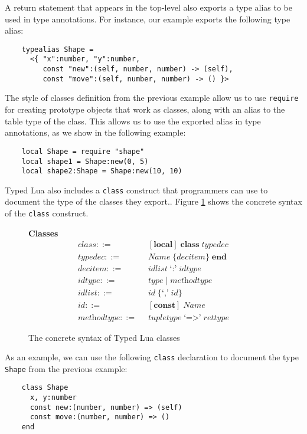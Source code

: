 A return statement that appears in the top-level also exports
a type alias to be used in type annotations.
For instance, our example exports the following type alias:
\begin{verbatim}
    typealias Shape =
      <{ "x":number, "y":number,
         const "new":(self, number, number) -> (self),
         const "move":(self, number, number) -> () }>
\end{verbatim}

The style of classes definition from the previous example
allow us to use \texttt{require} for creating prototype objects that
work as classes, along with an alias to the table type of the class.
This allows us to use the exported alias in type annotations,
as we show in the following example:
\begin{verbatim}
    local Shape = require "shape"
    local shape1 = Shape:new(0, 5)
    local shape2:Shape = Shape:new(10, 10)
\end{verbatim}

Typed Lua also includes a \texttt{class} construct that programmers
can use to document the type of the classes they export..
Figure \ref{fig:classes} shows the concrete syntax of the
\texttt{class} construct.

\begin{figure}[!ht]
\textbf{Classes}\\
\dstart
\begin{align*}
\textit{class} ::= & \;\; [\textbf{local}] \; \textbf{class} \; \textit{typedec}\\
\textit{typedec} ::= & \;\; \textit{Name} \; \{\textit{decitem}\} \; \textbf{end}\\
\textit{decitem} ::= & \;\; \textit{idlist} \; \texttt{`:'} \; \textit{idtype}\\
\textit{idtype} ::= & \;\; \textit{type} \; | \; \textit{methodtype}\\
\textit{idlist} ::= & \;\; \textit{id} \; \{\texttt{`,'} \; \textit{id}\}\\
\textit{id} ::= & \;\; [\textbf{const}] \; \textit{Name}\\
\textit{methodtype} ::= & \;\; \textit{tupletype} \; \texttt{`=>'} \; \textit{rettype}
\end{align*}
\dend
\caption{The concrete syntax of Typed Lua classes}
\label{fig:classes}
\end{figure}

As an example, we can use the following \texttt{class} declaration to
document the type \texttt{Shape} from the previous example:
\begin{verbatim}
    class Shape
      x, y:number
      const new:(number, number) => (self)
      const move:(number, number) => ()
    end
\end{verbatim}

